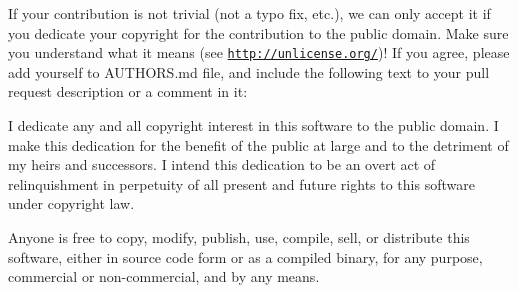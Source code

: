 If your contribution is not trivial (not a typo fix, etc.), we can only accept it if you dedicate your copyright for the contribution to the public domain. Make sure you understand what it means (see \href{http://unlicense.org/}{\tt http\+://unlicense.\+org/})! If you agree, please add yourself to A\+U\+T\+H\+O\+R\+S.\+md file, and include the following text to your pull request description or a comment in it\+: 

 \begin{DoxyVerb}I dedicate any and all copyright interest in this software to the
public domain. I make this dedication for the benefit of the public at
large and to the detriment of my heirs and successors. I intend this
dedication to be an overt act of relinquishment in perpetuity of all
present and future rights to this software under copyright law.

Anyone is free to copy, modify, publish, use, compile, sell, or
distribute this software, either in source code form or as a compiled
binary, for any purpose, commercial or non-commercial, and by any
means.\end{DoxyVerb}
 